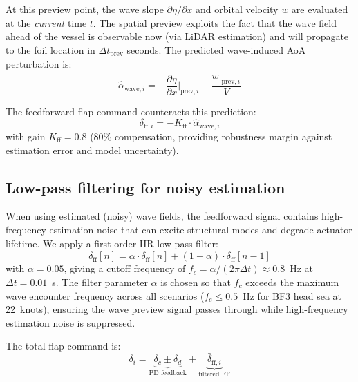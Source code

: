 \documentclass[review]{elsarticle}
\begin{document}
At this preview point, the wave slope $\partial\eta/\partial x$ and
orbital velocity $w$ are evaluated at the \emph{current} time $t$.
The spatial preview exploits the fact that the wave field ahead of
the vessel is observable now (via LiDAR estimation) and will propagate
to the foil location in $\Delta t_\text{prev}$ seconds.
The predicted wave-induced AoA perturbation is:
\begin{equation}
  \hat{\alpha}_{\text{wave},i} = -\frac{\partial\eta}{\partial x}\bigg|_{\text{prev},i}
    - \frac{w|_{\text{prev},i}}{V}
  \label{eq:alpha_preview}
\end{equation}

The feedforward flap command counteracts this prediction:
\begin{equation}
  \delta_{\text{ff},i} = -K_{\text{ff}} \cdot \hat{\alpha}_{\text{wave},i}
  \label{eq:ff_command}
\end{equation}
with gain $K_{\text{ff}} = 0.8$ (80\% compensation, providing
robustness margin against estimation error and model uncertainty).

\subsection{Low-pass filtering for noisy estimation}

When using estimated (noisy) wave fields, the feedforward signal
contains high-frequency estimation noise that can excite structural
modes and degrade actuator lifetime.
We apply a first-order IIR low-pass filter:
\begin{equation}
  \bar{\delta}_{\text{ff}}[n] = \alpha \cdot \delta_{\text{ff}}[n]
    + (1 - \alpha) \cdot \bar{\delta}_{\text{ff}}[n-1]
  \label{eq:lpf}
\end{equation}
with $\alpha = 0.05$, giving a cutoff frequency of
$f_c = \alpha/(2\pi\Delta t) \approx 0.8$~Hz at $\Delta t = 0.01$~s.
The filter parameter $\alpha$ is chosen so that $f_c$ exceeds the
maximum wave encounter frequency across all scenarios
($f_e \leq 0.5$~Hz for BF3 head sea at 22~knots), ensuring
the wave preview signal passes through while high-frequency
estimation noise is suppressed.

The total flap command is:
\begin{equation}
  \delta_i = \underbrace{\delta_c \pm \delta_d}_{\text{PD feedback}}
    + \underbrace{\bar{\delta}_{\text{ff},i}}_{\text{filtered FF}}
  \label{eq:total_flap}
\end{equation}
\end{document}
